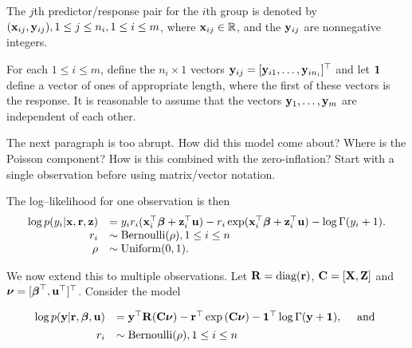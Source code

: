 \documentclass{article}[12pt]
\newcommand{\joc}[1]{{\color{red}#1}}
\begin{document}
The $j$th predictor/response pair for the $i$th group is denoted by $({\bf x}_{ij}, {\bf y}_{ij}), 1 \leq j \leq n_i, 1 \leq i \leq m$, where ${\bf x}_{ij} \in {\mathbb{R}}$, and the ${\bf y}_{ij}$ are nonnegative integers.

\noindent For each $1 \leq i \leq m$, define the $n_i \times 1$ vectors ${\bf y}_{ij} = [{\bf y}_{i 1}, \ldots, {\bf y}_{i
	n_i}]^\top$ and let ${\bf 1}$ define a vector of ones of appropriate length, where the first of these vectors is
the response. It is reasonable to assume that the vectors ${\bf y}_1, \ldots, {\bf y}_m$ are independent of each
other.

\joc{The next paragraph is too abrupt. How did this model come about? Where is the Poisson component? How is this combined with the zero-inflation?
Start with a single observation before using matrix/vector notation.}

\noindent The log--likelihood for one observation is then
\begin{equation*}
	\begin{array}{rl}
		\log p(y_i | {\bf x}, {\bf r}, {\bf z}) & = y_i r_i ({\bf x}_i^\top {\boldsymbol\beta} + {\bf z}_i^\top {\bf u}) - r_i \exp ({\bf x}_i^\top {\boldsymbol\beta} + {\bf z}_i^\top {\bf u}) - \log \Gamma (y_i + 1). \\
		r_i                         & \sim \text{Bernoulli}(\rho), 1 \leq i \leq n                                                                            \\
		\rho                        & \sim \mbox{Uniform}(0, 1).                                                                                              \\
	\end{array}
\end{equation*}

\noindent We now extend this to multiple observations. Let ${\bf R} = \text{diag}{({\bf r})}$, ${\bf C} = [{\bf X}, {\bf Z}]$ and ${\boldsymbol \nu} = [{\boldsymbol \beta}^\top, {\bf u}^\top]^\top$. Consider the model


\begin{equation}\label{eq:main}
	\begin{array}{rl}
		\log{p({\bf y}|{\bf r}, {\boldsymbol\beta}, {\bf u})} & = {\bf y}^\top {\bf R} ({\bf C}{\boldsymbol \nu}) - {\bf r}^\top \exp{({\bf C}{\boldsymbol\nu})} - {\bf 1}^\top \log{\Gamma{({\bf y}+ {\bf1})}}, \quad \mbox{ and } \\ [1ex]
		r_i                           & \sim \text{Bernoulli}(\rho), 1 \leq i \leq n                                                                     \\
	\end{array}
\end{equation}
\end{document}
